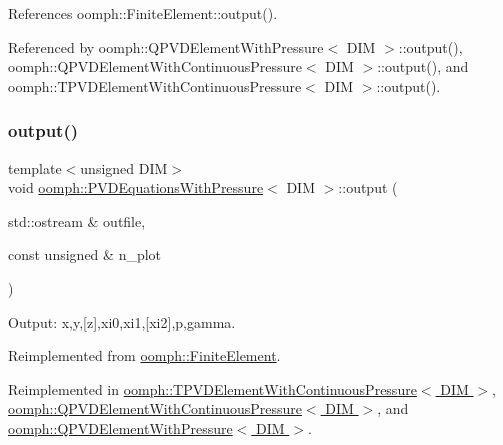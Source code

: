 References oomph\+::\+Finite\+Element\+::output().



Referenced by oomph\+::\+Q\+P\+V\+D\+Element\+With\+Pressure$<$ D\+I\+M $>$\+::output(), oomph\+::\+Q\+P\+V\+D\+Element\+With\+Continuous\+Pressure$<$ D\+I\+M $>$\+::output(), and oomph\+::\+T\+P\+V\+D\+Element\+With\+Continuous\+Pressure$<$ D\+I\+M $>$\+::output().

\mbox{\label{classoomph_1_1PVDEquationsWithPressure_a3522de42dcebba5f7531c5913857303d}} 
\subsubsection{\texorpdfstring{output()}{output()}\hspace{0.1cm}{\footnotesize\ttfamily [2/4]}}
{\footnotesize\ttfamily template$<$unsigned D\+IM$>$ \\
void \hyperlink{classoomph_1_1PVDEquationsWithPressure}{oomph\+::\+P\+V\+D\+Equations\+With\+Pressure}$<$ D\+IM $>$\+::output (\begin{DoxyParamCaption}\item[{std\+::ostream \&}]{outfile,  }\item[{const unsigned \&}]{n\+\_\+plot }\end{DoxyParamCaption})\hspace{0.3cm}{\ttfamily [virtual]}}



Output\+: x,y,\mbox{[}z\mbox{]},xi0,xi1,\mbox{[}xi2\mbox{]},p,gamma. 



Reimplemented from \hyperlink{classoomph_1_1FiniteElement_afa9d9b2670f999b43e6679c9dd28c457}{oomph\+::\+Finite\+Element}.



Reimplemented in \hyperlink{classoomph_1_1TPVDElementWithContinuousPressure_aefeba130e3533f5af5286830d271028d}{oomph\+::\+T\+P\+V\+D\+Element\+With\+Continuous\+Pressure$<$ D\+I\+M $>$}, \hyperlink{classoomph_1_1QPVDElementWithContinuousPressure_a52659b143c819c1fcc86a6473ef324f0}{oomph\+::\+Q\+P\+V\+D\+Element\+With\+Continuous\+Pressure$<$ D\+I\+M $>$}, and \hyperlink{classoomph_1_1QPVDElementWithPressure_ad47eebe6e14138c64fc313f3ecda8d6e}{oomph\+::\+Q\+P\+V\+D\+Element\+With\+Pressure$<$ D\+I\+M $>$}.



